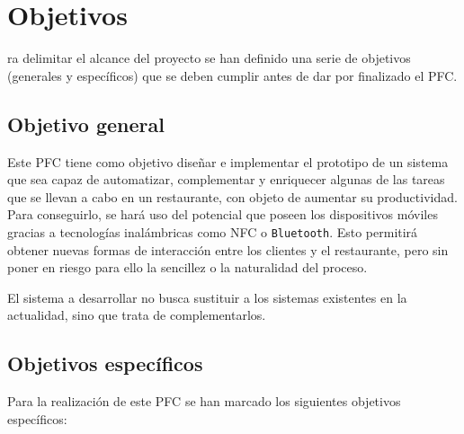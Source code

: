 
\chapter{Objetivos}
\label{chap:objectives}
ra delimitar el alcance del proyecto se han definido una serie de
objetivos (generales y específicos) que se deben cumplir antes de dar
por finalizado el \acs{PFC}.

\section{Objetivo general}
\label{sec:generalO}
Este \acs{PFC} tiene como objetivo diseñar e implementar el prototipo de un sistema
que sea capaz de automatizar, complementar y enriquecer algunas de las tareas 
que se llevan a cabo en un restaurante, con objeto de aumentar su
productividad. Para conseguirlo, se hará uso del potencial que poseen los 
dispositivos móviles gracias a tecnologías inalámbricas como \acs{NFC} o
\texttt{Bluetooth}. Esto permitirá obtener nuevas formas de interacción entre los 
clientes y el restaurante, pero sin poner en riesgo para ello la sencillez o la 
naturalidad del proceso.

El sistema a desarrollar no busca sustituir a los sistemas existentes en la
actualidad, sino que trata de complementarlos.

\section{Objetivos específicos}
\label{sec:specificO}
Para la realización de este \acs{PFC} se han marcado los siguientes objetivos
específicos:
